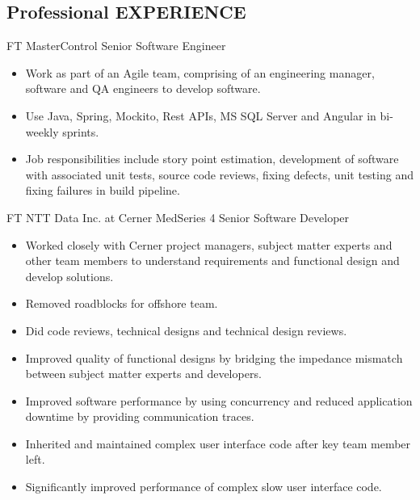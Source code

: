 \documentclass[10pt]{article} %
\begin{document}
\begin{paracol}{2}

\section{Professional EXPERIENCE}




{FT} %
{MasterControl} %
{Senior Software Engineer} %
{} %
\begin{itemize}
	\setlength\itemsep{0em}
	\item Work as part of an Agile team, comprising of an engineering manager, software and QA engineers to develop software.
	\item Use Java, Spring, Mockito, Rest APIs, MS SQL Server and Angular in bi-weekly sprints.
	\item Job responsibilities include story point estimation, development of software with associated unit tests, source code reviews, fixing defects, unit testing and fixing failures in build pipeline.
\end{itemize}

{FT} %
{NTT Data Inc. at Cerner MedSeries 4} %
{Senior Software Developer} %
{}\begin{itemize}
	\setlength\itemsep{0em}
	\item Worked closely with Cerner project managers, subject matter experts and other team members to understand requirements and functional design and develop solutions. 
	\item Removed roadblocks for offshore team. 
	\item Did code reviews, technical designs and technical design reviews. 
	\item Improved quality of functional designs by bridging the impedance mismatch between subject matter experts and developers.
	\item Improved software performance by using concurrency and reduced application downtime by providing communication traces.
	\item	Inherited and maintained complex user interface code after key team member left. 
	\item Significantly improved performance of complex slow user interface code. %
\end{itemize}
\switchcolumn %



\end{paracol}
\end{document}
